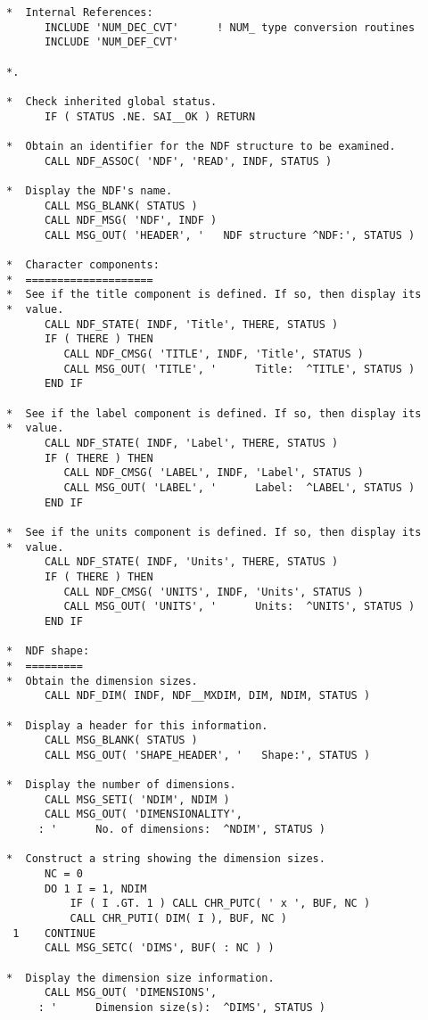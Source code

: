 \begin{verbatim}
*  Internal References:
      INCLUDE 'NUM_DEC_CVT'      ! NUM_ type conversion routines
      INCLUDE 'NUM_DEF_CVT'

*.

*  Check inherited global status.
      IF ( STATUS .NE. SAI__OK ) RETURN

*  Obtain an identifier for the NDF structure to be examined.
      CALL NDF_ASSOC( 'NDF', 'READ', INDF, STATUS )

*  Display the NDF's name.
      CALL MSG_BLANK( STATUS )
      CALL NDF_MSG( 'NDF', INDF )
      CALL MSG_OUT( 'HEADER', '   NDF structure ^NDF:', STATUS )

*  Character components:
*  ====================
*  See if the title component is defined. If so, then display its
*  value.
      CALL NDF_STATE( INDF, 'Title', THERE, STATUS )
      IF ( THERE ) THEN
         CALL NDF_CMSG( 'TITLE', INDF, 'Title', STATUS )
         CALL MSG_OUT( 'TITLE', '      Title:  ^TITLE', STATUS )
      END IF

*  See if the label component is defined. If so, then display its
*  value.
      CALL NDF_STATE( INDF, 'Label', THERE, STATUS )
      IF ( THERE ) THEN
         CALL NDF_CMSG( 'LABEL', INDF, 'Label', STATUS )
         CALL MSG_OUT( 'LABEL', '      Label:  ^LABEL', STATUS )
      END IF

*  See if the units component is defined. If so, then display its
*  value.
      CALL NDF_STATE( INDF, 'Units', THERE, STATUS )
      IF ( THERE ) THEN
         CALL NDF_CMSG( 'UNITS', INDF, 'Units', STATUS )
         CALL MSG_OUT( 'UNITS', '      Units:  ^UNITS', STATUS )
      END IF

*  NDF shape:
*  =========
*  Obtain the dimension sizes.
      CALL NDF_DIM( INDF, NDF__MXDIM, DIM, NDIM, STATUS )

*  Display a header for this information.
      CALL MSG_BLANK( STATUS )
      CALL MSG_OUT( 'SHAPE_HEADER', '   Shape:', STATUS )

*  Display the number of dimensions.
      CALL MSG_SETI( 'NDIM', NDIM )
      CALL MSG_OUT( 'DIMENSIONALITY',
     : '      No. of dimensions:  ^NDIM', STATUS )

*  Construct a string showing the dimension sizes.
      NC = 0
      DO 1 I = 1, NDIM
          IF ( I .GT. 1 ) CALL CHR_PUTC( ' x ', BUF, NC )
          CALL CHR_PUTI( DIM( I ), BUF, NC )
 1    CONTINUE
      CALL MSG_SETC( 'DIMS', BUF( : NC ) )

*  Display the dimension size information.
      CALL MSG_OUT( 'DIMENSIONS',
     : '      Dimension size(s):  ^DIMS', STATUS )


\end{verbatim}
